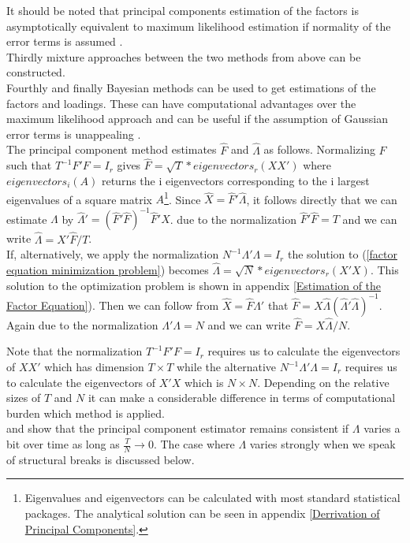 \documentclass[12pt]{article}
\begin{document}
It should be noted that principal components estimation of the factors is asymptotically equivalent to maximum likelihood estimation if normality of the error terms is assumed \citep{bai2003inferential}. \\
Thirdly mixture approaches between the two methods from above can be constructed. \\
Fourthly and finally Bayesian methods can be used to get estimations of the factors and loadings. These can have computational advantages over the maximum likelihood approach and can be useful if the assumption of Gaussian error terms is unappealing \citep{stock2011dynamic}. \\

The principal component method estimates $\hat F$ and $\hat \Lambda$ as follows. Normalizing $F$ such that $T^{-1}F'F = I_r$ gives $\hat F = \sqrt{T} * eigenvectors_r(XX')$ where $eigenvectors_i(A)$ returns the i eigenvectors corresponding to the i largest eigenvalues of a square matrix $A$\footnote{Eigenvalues and eigenvectors can be calculated with most standard statistical packages. The analytical solution can be seen in appendix \ref{Derrivation of Principal Components}.}. Since $\hat X = \hat F' \hat \Lambda$, it follows directly that we can estimate $\Lambda$ by $\hat \Lambda' = (\hat F' \hat F)^{-1} \hat F'X$. due to the normalization $\hat F' \hat F = T$ and we can write $\hat \Lambda = X' \hat F / T$. \\
If, alternatively, we apply the normalization $N^{-1}\Lambda'\Lambda = I_r$ the solution to (\ref{factor equation minimization problem}) becomes $\hat \Lambda = \sqrt{N} * eigenvectors_r(X'X)$. This solution to the optimization problem is shown in appendix \ref{Estimation of the Factor Equation}). Then we can follow from $\hat X = \hat F \hat \Lambda'$ that $\hat F = X \hat \Lambda (\hat \Lambda' \hat \Lambda)^{-1}$. Again due to the normalization $\Lambda' \Lambda = N$ and we can write $\hat F = X \hat \Lambda / N$.

Note that the normalization $T^{-1}F'F = I_r$ requires us to calculate the eigenvectors of $XX'$ which has dimension $T \times T$ while the alternative $N^{-1}\Lambda'\Lambda = I_r$ requires us to calculate the eigenvectors of $X'X$ which is $N \times N$. Depending on the relative sizes of $T$ and $N$ it can make a considerable difference in terms of computational burden which method is applied. \\

\citet{stock1998diffusion} and \citet{stock2002macroeconomic} show that the principal component estimator remains consistent if $\Lambda$ varies a bit over time as long as $\frac{T}{N} \to 0$. The case where $\Lambda$ varies strongly when we speak of structural breaks is discussed below.
\end{document}
